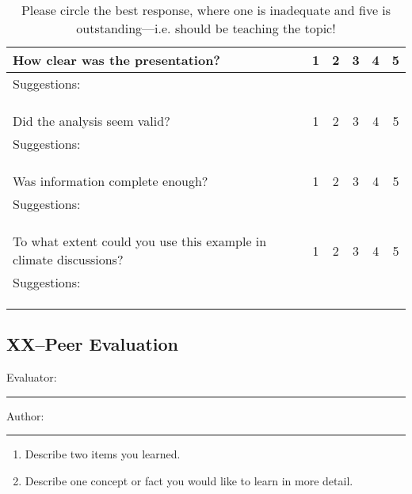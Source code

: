 \documentclass{article}\usepackage[]{graphicx}\usepackage[]{color}
\begin{document}
\begin{table}[ht!]
\caption{Please circle the best response, where one is inadequate and five is outstanding---i.e. should be teaching the topic!}
\begin{tabular}{|p{4in}|ccccc|}\hline
How clear was the presentation?     & 1 & 2 & 3 & 4 & 5 \\ \hline
Suggestions: &&&&& \\ &&&&& \\ &&&&& \\
&&&&& \\ \hline
Did the analysis seem valid?        & 1 & 2 & 3 & 4 & 5 \\ \hline
Suggestions: &&&&& \\ &&&&& \\ &&&&& \\
&&&&& \\ \hline
Was information complete enough?            & 1 & 2 & 3 & 4 & 5 \\ \hline
Suggestions: &&&&& \\ &&&&& \\ &&&&& \\
&&&&& \\ \hline
To what extent could you use this example in climate discussions?            & 1 & 2 & 3 & 4 & 5 \\ \hline
Suggestions: &&&&& \\ &&&&& \\ &&&&& \\
&&&&& \\ \hline
\end{tabular}
\end{table}

\clearpage
\newpage
\subsection{XX--Peer Evaluation}

\bigskip
Evaluator: \rule{7cm}{0.4pt}

\bigskip

\noindent Author: \rule{7cm}{0.4pt}

\begin{enumerate}
 \setlength\itemsep{4em}
  \item Describe two items you learned.
  \item Describe one concept or fact you would like to learn in more detail.
\end{enumerate}
\end{document}
